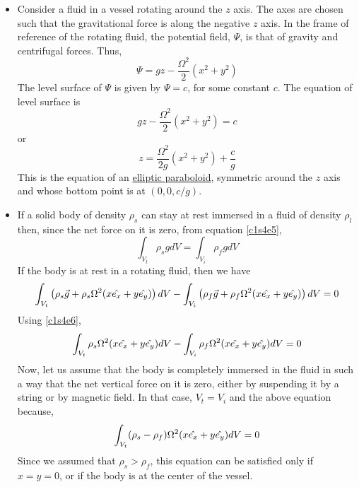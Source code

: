 \begin{itemize}
\item Consider a fluid in a vessel rotating around the $z$ axis. The axes are chosen such that the gravitational force is along the negative $z$ axis. In the frame of reference of the
rotating fluid, the potential field, $\Psi$, is that of gravity and centrifugal forces. Thus,
\[
\Psi = gz - \frac{\Omega^2}{2}(x^2 + y^2)
\]
The level surface of $\Psi$ is given by $\Psi = c$, for some constant $c$. The equation of level surface is
\[
gz - \frac{\Omega^2}{2}(x^2 + y^2) = c
\]
or
\[
z = \frac{\Omega^2}{2g}(x^2 + y^2) + \frac{c}{g}
\]
This is the equation of an \href{https://en.wikipedia.org/wiki/Paraboloid}{elliptic paraboloid}, symmetric around the $z$ axis and whose bottom point is at $(0, 0, c/g)$.

\item If a solid body of density $\rho_s$ can stay at rest immersed in a fluid of density $\rho_l$ then, since the net force on it is zero, from equation \eqref{c1s4e5},
\begin{equation}\label{c1s4e6}
\int_{V_t} \rho_s gdV = \int_{V_i} \rho_f gdV
\end{equation}
If the body is at rest in a rotating fluid, then we have
\[
\int_{V_t}\left(\rho_s\vec{g} + \rho_s\Omega^2(x\hat{e_{x}} + y\hat{e_{y}})\right)dV - \int_{V_i}\left(\rho_f\vec{g} + \rho_f\Omega^2(x\hat{e_{x}} + y\hat{e_{y}})\right)dV = 0
\]
Using \eqref{c1s4e6},
\[
\int_{V_t}\rho_s \Omega^2(x\hat{e_{x}} + y\hat{e_{y}}) dV - \int_{V_i}\rho_f \Omega^2(x\hat{e_{x}} + y\hat{e_{y}}) dV = 0
\]
Now, let us assume that the body is completely immersed in the fluid in such a way that the net vertical force on it is zero, either by suspending it by a string or by magnetic field. In
that case, $V_t = V_i$ and the above equation because,
\[
\int_{V_t}(\rho_s - \rho_f)\Omega^2(x\hat{e_{x}} + y\hat{e_{y}}) dV = 0
\]
Since we assumed that $\rho_s > \rho_f$, this equation can be satisfied only if $x = y = 0$, or if the body is at the center of the vessel.


\end{itemize}
